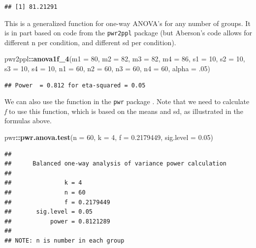 \documentclass[
]{book}
\newenvironment{Shaded}{\begin{snugshade}}{\end{snugshade}}
\newcommand{\DataTypeTok}[1]{\textcolor[rgb]{0.13,0.29,0.53}{#1}}
\newcommand{\DecValTok}[1]{\textcolor[rgb]{0.00,0.00,0.81}{#1}}
\newcommand{\FloatTok}[1]{\textcolor[rgb]{0.00,0.00,0.81}{#1}}
\newcommand{\KeywordTok}[1]{\textcolor[rgb]{0.13,0.29,0.53}{\textbf{#1}}}
\newcommand{\NormalTok}[1]{#1}
\newcommand{\OperatorTok}[1]{\textcolor[rgb]{0.81,0.36,0.00}{\textbf{#1}}}
\begin{document}
\begin{verbatim}
## [1] 81.21291
\end{verbatim}

This is a generalized function for one-way ANOVA's for any number of groups. It is in part based on code from the \texttt{pwr2ppl} \citep{R-pwr2ppl} package (but Aberson's code allows for different n per condition, and different sd per condition).

\begin{Shaded}
\begin{Highlighting}[]
\NormalTok{pwr2ppl}\OperatorTok{::}\KeywordTok{anova1f_4}\NormalTok{(}\DataTypeTok{m1 =} \DecValTok{80}\NormalTok{, }\DataTypeTok{m2 =} \DecValTok{82}\NormalTok{, }\DataTypeTok{m3 =} \DecValTok{82}\NormalTok{, }\DataTypeTok{m4 =} \DecValTok{86}\NormalTok{,}
          \DataTypeTok{s1 =} \DecValTok{10}\NormalTok{, }\DataTypeTok{s2 =} \DecValTok{10}\NormalTok{, }\DataTypeTok{s3 =} \DecValTok{10}\NormalTok{, }\DataTypeTok{s4 =} \DecValTok{10}\NormalTok{,}
          \DataTypeTok{n1 =} \DecValTok{60}\NormalTok{, }\DataTypeTok{n2 =} \DecValTok{60}\NormalTok{, }\DataTypeTok{n3 =} \DecValTok{60}\NormalTok{, }\DataTypeTok{n4 =} \DecValTok{60}\NormalTok{,}
          \DataTypeTok{alpha =} \FloatTok{.05}\NormalTok{)}
\end{Highlighting}
\end{Shaded}

\begin{verbatim}
## Power  = 0.812 for eta-squared = 0.05
\end{verbatim}

We can also use the function in the \texttt{pwr} package \citep{R-pwr}. Note that we need to calculate \emph{f} to use this function, which is based on the means and sd, as illustrated in the formulas above.

\begin{Shaded}
\begin{Highlighting}[]
\NormalTok{pwr}\OperatorTok{::}\KeywordTok{pwr.anova.test}\NormalTok{(}\DataTypeTok{n =} \DecValTok{60}\NormalTok{,}
               \DataTypeTok{k =} \DecValTok{4}\NormalTok{,}
               \DataTypeTok{f =} \FloatTok{0.2179449}\NormalTok{,}
               \DataTypeTok{sig.level =} \FloatTok{0.05}\NormalTok{)}
\end{Highlighting}
\end{Shaded}

\begin{verbatim}
## 
##      Balanced one-way analysis of variance power calculation 
## 
##               k = 4
##               n = 60
##               f = 0.2179449
##       sig.level = 0.05
##           power = 0.8121289
## 
## NOTE: n is number in each group
\end{verbatim}
\end{document}
